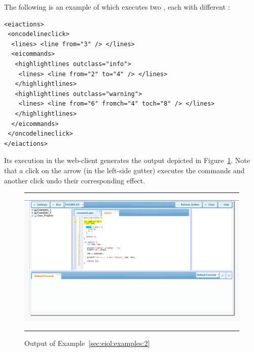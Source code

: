 \begin{example}
\label{sec:eiol:examples:2}
%
The following is an example of
 which executes two
, each with different
:

\medskip
\begin{lstlisting}
<eiactions>
 <oncodelineclick>
  <lines> <line from="3" /> </lines>
  <eicommands>
   <highlightlines outclass="info">
    <lines> <line from="2" to="4" /> </lines>
   </highlightlines>
   <highlightlines outclass="warning">
    <lines> <line from="6" fromch="4" toch="8" /> </lines>
   </highlightlines>
  </eicommands>
 </oncodelineclick>
</eiactions>
\end{lstlisting}

\medskip
\noindent
Its execution in the web-client generates the output depicted in
Figure~\ref{fig:examples:2}. Note that a click on the arrow (in the
left-side gutter) executes the commands and another click undo their
corresponding effect.


\begin{figure}[h]
\hrule\smallskip
\begin{center}
\includegraphics[width=1\textwidth]{fig/example2.png}
\end{center}
\caption{Output of Example~\ref{sec:eiol:examples:2}}
\label{fig:examples:2}
\hrule
\end{figure}
\end{example}



